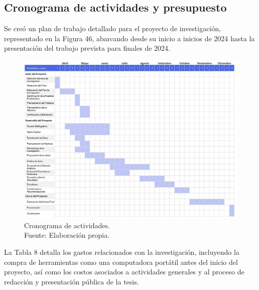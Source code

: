 \begin{landscape}
	\section{Cronograma de actividades y presupuesto}
	Se creó un plan de trabajo detallado para el proyecto de investigación, representado en la Figura 46, abarcando desde su inicio a inicios de 2024 hasta la presentación del trabajo prevista para finales de 2024.

	\begin{figure}[!ht]
		\begin{center}
			\includegraphics[width=1.35\textwidth]{3/figures/gantt.jpg}
			\caption[Cronograma de actividades]{Cronograma de actividades.\\
				Fuente: Elaboración propia.}
			\label{3:fig1}
		\end{center}
	\end{figure}
	
\end{landscape}

La Tabla 8 detalla los gastos relacionados con la investigación, incluyendo la compra de herramientas como una computadora portátil antes del inicio del proyecto, así como los costos asociados a actividades generales y al proceso de redacción y presentación pública de la tesis.

